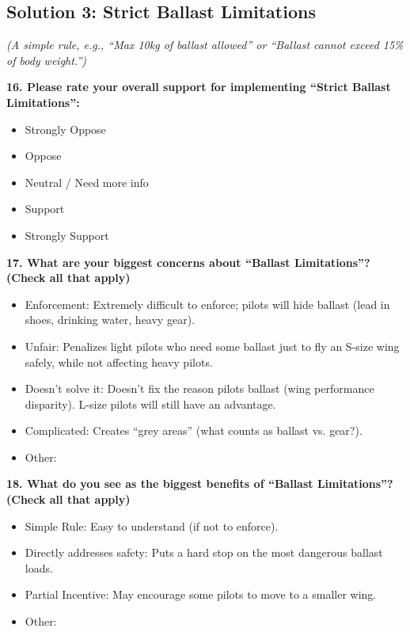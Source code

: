 \documentclass[11pt,a4paper]{article}
\begin{document}
\subsection{Solution 3: Strict Ballast Limitations}

\textit{(A simple rule, e.g., ``Max 10kg of ballast allowed'' or ``Ballast cannot exceed 15\% of body weight.'')}

\textbf{16. Please rate your overall support for implementing ``Strict Ballast Limitations'':}
\begin{itemize}[label=$\square$]
    \item Strongly Oppose
    \item Oppose
    \item Neutral / Need more info
    \item Support
    \item Strongly Support
\end{itemize}

\textbf{17. What are your biggest concerns about ``Ballast Limitations''? (Check all that apply)}
\begin{itemize}[label=$\square$]
    \item Enforcement: Extremely difficult to enforce; pilots will hide ballast (lead in shoes, drinking water, heavy gear).
    \item Unfair: Penalizes light pilots who need some ballast just to fly an S-size wing safely, while not affecting heavy pilots.
    \item Doesn't solve it: Doesn't fix the reason pilots ballast (wing performance disparity). L-size pilots will still have an advantage.
    \item Complicated: Creates ``grey areas'' (what counts as ballast vs. gear?).
    \item Other: \underline{\hspace{3cm}}
\end{itemize}

\textbf{18. What do you see as the biggest benefits of ``Ballast Limitations''? (Check all that apply)}
\begin{itemize}[label=$\square$]
    \item Simple Rule: Easy to understand (if not to enforce).
    \item Directly addresses safety: Puts a hard stop on the most dangerous ballast loads.
    \item Partial Incentive: May encourage some pilots to move to a smaller wing.
    \item Other: \underline{\hspace{3cm}}
\end{itemize}
\end{document}
